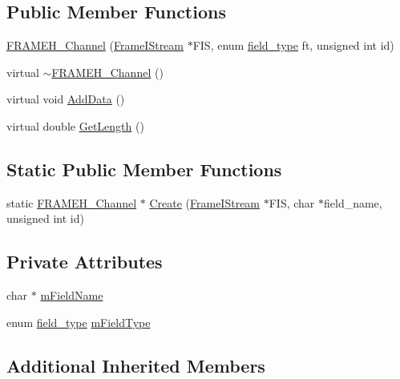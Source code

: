 \subsection*{Public Member Functions}
\begin{DoxyCompactItemize}
\item 
\hyperlink{classtsa_1_1_f_r_a_m_e_h___channel_a27a8bc2d9aba282cb68f855c49b2eaba}{F\+R\+A\+M\+E\+H\+\_\+\+Channel} (\hyperlink{classtsa_1_1_frame_i_stream}{Frame\+I\+Stream} $\ast$F\+IS, enum \hyperlink{classtsa_1_1_f_r_a_m_e_h___channel_af9bd3bfda5ebc40f65e8af27abac9fe3}{field\+\_\+type} ft, unsigned int id)
\item 
virtual \hyperlink{classtsa_1_1_f_r_a_m_e_h___channel_a6174aa904d4e084e77695f8e19b8fcd2}{$\sim$\+F\+R\+A\+M\+E\+H\+\_\+\+Channel} ()
\item 
virtual void \hyperlink{classtsa_1_1_f_r_a_m_e_h___channel_af757e23c465da95ac0ed7b97876ead66}{Add\+Data} ()
\item 
virtual double \hyperlink{classtsa_1_1_f_r_a_m_e_h___channel_a022b134fb62d99e8cb00a6ce28b2d569}{Get\+Length} ()
\end{DoxyCompactItemize}
\subsection*{Static Public Member Functions}
\begin{DoxyCompactItemize}
\item 
static \hyperlink{classtsa_1_1_f_r_a_m_e_h___channel}{F\+R\+A\+M\+E\+H\+\_\+\+Channel} $\ast$ \hyperlink{classtsa_1_1_f_r_a_m_e_h___channel_a9a920292ece110df4cdce41f9f8e451b}{Create} (\hyperlink{classtsa_1_1_frame_i_stream}{Frame\+I\+Stream} $\ast$F\+IS, char $\ast$field\+\_\+name, unsigned int id)
\end{DoxyCompactItemize}
\subsection*{Private Attributes}
\begin{DoxyCompactItemize}
\item 
char $\ast$ \hyperlink{classtsa_1_1_f_r_a_m_e_h___channel_aff87ea1426812c4e02ccaa741774db29}{m\+Field\+Name}
\item 
enum \hyperlink{classtsa_1_1_f_r_a_m_e_h___channel_af9bd3bfda5ebc40f65e8af27abac9fe3}{field\+\_\+type} \hyperlink{classtsa_1_1_f_r_a_m_e_h___channel_a3a63c899c18c606c39c2cd32859d3b05}{m\+Field\+Type}
\end{DoxyCompactItemize}
\subsection*{Additional Inherited Members}


